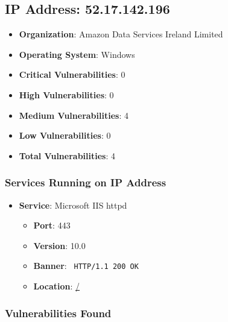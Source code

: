 \documentclass{article}
\begin{document}
\clearpage



\subsection*{IP Address: 52.17.142.196}

\begin{itemize}
    \item \textbf{Organization}: Amazon Data Services Ireland Limited
    \item \textbf{Operating System}:  Windows 
    \item \textbf{Critical Vulnerabilities}: 0
    \item \textbf{High Vulnerabilities}: 0
    \item \textbf{Medium Vulnerabilities}: 4
    \item \textbf{Low Vulnerabilities}: 0
    \item \textbf{Total Vulnerabilities}: 4
\end{itemize}

\subsubsection*{Services Running on IP Address}

\begin{itemize}
    
        \item \textbf{Service}: Microsoft IIS httpd
        \begin{itemize}
            \item \textbf{Port}: 443
            \item \textbf{Version}:  10.0 
            \item \textbf{Banner}: \texttt{ HTTP/1.1 200 OK
 }
            \item \textbf{Location}: \href{ / }{ / }
        \end{itemize}
    
\end{itemize}


\subsubsection*{Vulnerabilities Found}
\end{document}
